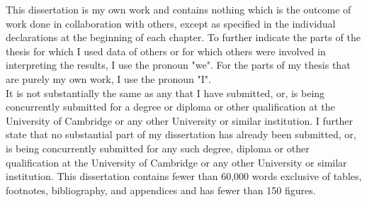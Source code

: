 
\begin{declaration}

This dissertation is my own work and contains nothing which is the outcome of work done in collaboration with others, except as specified in the individual declarations at the beginning of each chapter. 
To further indicate the parts of the thesis for which I used data of others or for which others were involved in interpreting the results, I use the pronoun "we". 
For the parts of my thesis that are purely my own work, I use the pronoun "I".  \\

It is not substantially the same as any that I have submitted, or, is being concurrently submitted for a degree or diploma or other qualification at the University of Cambridge or any other University or similar institution. 
I further state that no substantial part of my dissertation has already been submitted, or, is being concurrently submitted for any such degree, diploma or other qualification at the University of Cambridge or any other University or similar institution. 
This dissertation contains fewer than 60,000 words exclusive of tables, footnotes, bibliography, and appendices and has fewer than 150 figures.
\end{declaration}

